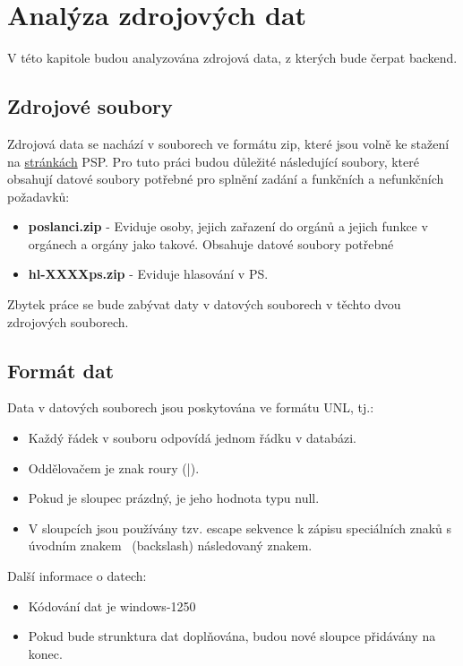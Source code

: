 \chapter{Analýza zdrojových dat}
\label{ch:analysis_data}
\setcounter{page}{1}

V této kapitole budou analyzována zdrojová data, z kterých bude čerpat backend.

\section{Zdrojové soubory}

Zdrojová data se nachází v souborech ve formátu zip, které jsou volně ke stažení na \href{https://www.psp.cz/sqw/hp.sqw?k=1300}{\color{blue}stránkách} PSP. Pro tuto práci budou důležité následující soubory, které obsahují datové soubory potřebné pro splnění zadání a funkčních a nefunkčních požadavků:

\begin{itemize}
	\item \textbf{poslanci.zip} - Eviduje osoby, jejich zařazení do orgánů a jejich funkce v orgánech a orgány jako takové. Obsahuje datové soubory potřebné 
	\item \textbf{hl-XXXXps.zip} - Eviduje hlasování v PS.
\end{itemize}

\noindent Zbytek práce se bude zabývat daty v datových souborech v těchto dvou zdrojových souborech.

\section{Formát dat}
Data v datových souborech jsou poskytována ve formátu UNL, tj.:

\begin{itemize}
	\item Každý řádek v souboru odpovídá jednom řádku v databázi.
	\item Oddělovačem je znak roury (|).
	\item Pokud je sloupec prázdný, je jeho hodnota typu null.
	\item V sloupcích jsou používány tzv. escape sekvence k zápisu speciálních znaků s úvodním znakem \ (backslash) následovaný znakem.
\end{itemize}

\noindent Další informace o datech:

\begin{itemize}
	\item Kódování dat je windows-1250
	\item Pokud bude strunktura dat doplňována, budou nové sloupce přidávány na konec.
\end{itemize}

